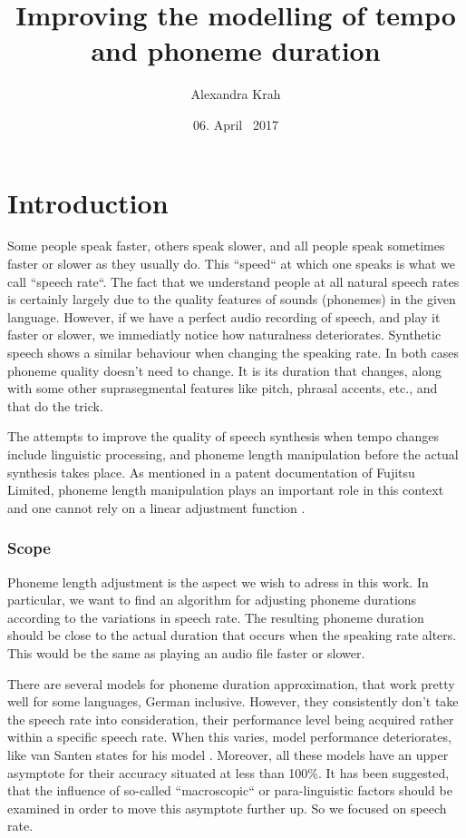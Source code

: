\documentclass[a4paper]{scrreprt}
\begin{document}
\title{Improving the modelling of tempo and phoneme duration}
\author{Alexandra Krah}
\date{06. April ~2017}
\maketitle
\chapter*{}
\tableofcontents
\listoffigures

\chapter{Introduction}
Some people speak faster, others speak slower, and all people speak sometimes faster or slower as they usually do. This ``speed`` at which one speaks is what we call ``speech rate``. The fact that we understand people at all natural speech rates is certainly largely due to the quality features of sounds (phonemes) in the given language. However, if we have a perfect audio recording of speech, and play it faster or slower, we immediatly notice how naturalness deteriorates. Synthetic speech shows a similar behaviour when changing the speaking rate. In both cases phoneme quality doesn't need to change. It is its duration that changes, along with some other suprasegmental features like pitch, phrasal accents, etc., and that do the trick. 

The attempts to improve the quality of speech synthesis when tempo changes include linguistic processing, and phoneme length manipulation before the actual synthesis takes place. As mentioned in a patent documentation of Fujitsu Limited, phoneme length manipulation plays an important role in this context and one cannot rely on a linear adjustment function \cite{nishiike2008}. 

\subsection*{Scope}
Phoneme length adjustment is the aspect we wish to adress in this work. In particular, we want to find an algorithm for adjusting phoneme durations according to the variations in speech rate. The resulting phoneme duration should be close to the actual duration that occurs when the speaking rate alters. This would be the same as playing an audio file faster or slower. 

There are several models for phoneme duration approximation, that work pretty well for some languages, German inclusive. However, they consistently don't take the speech rate into consideration, their performance level being acquired rather within a specific speech rate. When this varies, model performance deteriorates, like van Santen states for his model \cite{Santen1994}. Moreover, all these models have an upper asymptote for their accuracy situated at less than 100\%. It has been suggested, that the influence of so-called ``macroscopic`` \cite{Cummins1999} or para-linguistic \cite{Santen1994} factors should be examined in order to move this asymptote further up. So we focused on speech rate. 
\end{document}
